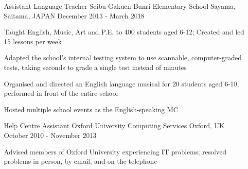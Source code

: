 \begin{cventries}
  \cventry
  {Assistant Language Teacher} %
  {Seibu Gakuen Bunri Elementary School} %
  {Sayama, Saitama, JAPAN} %
  {December 2013 - March 2018} %
  {
    \begin{cvitems} %
      \item {Taught English, Music, Art and P.E. to 400 students aged 6-12; Created and led 15 lessons per week}
      \item {Adapted the school's internal testing system to use scannable, computer-graded tests, taking seconds to grade a single test instead of minutes}
      \item {Organised and directed an English language musical for 20 students aged 6-10, performed in front of the entire school}
      \item {Hosted multiple school events as the English-speaking MC}
    \end{cvitems}
  }

  \cventry
  {Help Centre Assistant} %
  {Oxford University Computing Services} %
  {Oxford, UK} %
  {October 2010 - November 2013} %
  {
    \begin{cvitems} %
      \item {Advised members of Oxford University experiencing IT problems; resolved problems in person, by email, and on the telephone}
    \end{cvitems}
  }

\end{cventries}

